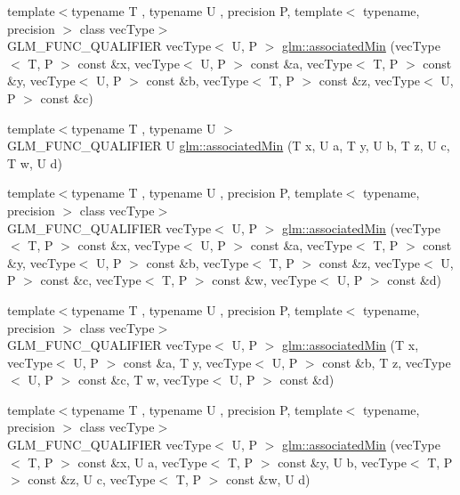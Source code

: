 \begin{DoxyCompactItemize}
\item 
{\footnotesize template$<$typename T , typename U , precision P, template$<$ typename, precision $>$ class vec\+Type$>$ }\\G\+L\+M\+\_\+\+F\+U\+N\+C\+\_\+\+Q\+U\+A\+L\+I\+F\+I\+ER vec\+Type$<$ U, P $>$ \hyperlink{group__gtx__associated__min__max_ga5bc6b9acbf9e060d58a342fbe3b73d43}{glm\+::associated\+Min} (vec\+Type$<$ T, P $>$ const \&x, vec\+Type$<$ U, P $>$ const \&a, vec\+Type$<$ T, P $>$ const \&y, vec\+Type$<$ U, P $>$ const \&b, vec\+Type$<$ T, P $>$ const \&z, vec\+Type$<$ U, P $>$ const \&c)
\item 
{\footnotesize template$<$typename T , typename U $>$ }\\G\+L\+M\+\_\+\+F\+U\+N\+C\+\_\+\+Q\+U\+A\+L\+I\+F\+I\+ER U \hyperlink{group__gtx__associated__min__max_ga432224ebe2085eaa2b63a077ecbbbff6}{glm\+::associated\+Min} (T x, U a, T y, U b, T z, U c, T w, U d)
\item 
{\footnotesize template$<$typename T , typename U , precision P, template$<$ typename, precision $>$ class vec\+Type$>$ }\\G\+L\+M\+\_\+\+F\+U\+N\+C\+\_\+\+Q\+U\+A\+L\+I\+F\+I\+ER vec\+Type$<$ U, P $>$ \hyperlink{group__gtx__associated__min__max_ga88e031f22b80215505928900d3dde549}{glm\+::associated\+Min} (vec\+Type$<$ T, P $>$ const \&x, vec\+Type$<$ U, P $>$ const \&a, vec\+Type$<$ T, P $>$ const \&y, vec\+Type$<$ U, P $>$ const \&b, vec\+Type$<$ T, P $>$ const \&z, vec\+Type$<$ U, P $>$ const \&c, vec\+Type$<$ T, P $>$ const \&w, vec\+Type$<$ U, P $>$ const \&d)
\item 
{\footnotesize template$<$typename T , typename U , precision P, template$<$ typename, precision $>$ class vec\+Type$>$ }\\G\+L\+M\+\_\+\+F\+U\+N\+C\+\_\+\+Q\+U\+A\+L\+I\+F\+I\+ER vec\+Type$<$ U, P $>$ \hyperlink{group__gtx__associated__min__max_ga0f63b0dce5a5c3242cc6d9847e7d14f1}{glm\+::associated\+Min} (T x, vec\+Type$<$ U, P $>$ const \&a, T y, vec\+Type$<$ U, P $>$ const \&b, T z, vec\+Type$<$ U, P $>$ const \&c, T w, vec\+Type$<$ U, P $>$ const \&d)
\item 
{\footnotesize template$<$typename T , typename U , precision P, template$<$ typename, precision $>$ class vec\+Type$>$ }\\G\+L\+M\+\_\+\+F\+U\+N\+C\+\_\+\+Q\+U\+A\+L\+I\+F\+I\+ER vec\+Type$<$ U, P $>$ \hyperlink{group__gtx__associated__min__max_ga00a949fd345f4b31b259f033d3ab4a1c}{glm\+::associated\+Min} (vec\+Type$<$ T, P $>$ const \&x, U a, vec\+Type$<$ T, P $>$ const \&y, U b, vec\+Type$<$ T, P $>$ const \&z, U c, vec\+Type$<$ T, P $>$ const \&w, U d)

\end{DoxyCompactItemize}
